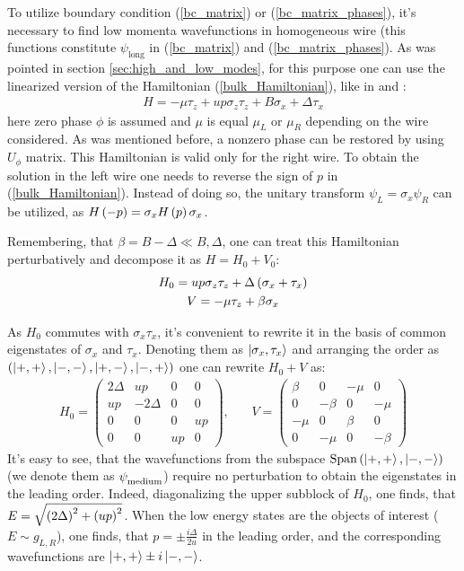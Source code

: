 To utilize boundary condition (\ref{bc_matrix}) or (\ref{bc_matrix_phases}), it's necessary to find low momenta wavefunctions in homogeneous wire (this functions constitute $ \psi_{\mathrm{long}}$ in (\ref{bc_matrix}) and (\ref{bc_matrix_phases}). As was pointed in section \ref{sec:high_and_low_modes}, for this purpose one can use the linearized version of the Hamiltonian (\ref{bulk_Hamiltonian}), like in \cite{Oreg_2010} and \cite{Lutchyn_2010}:
\begin{gather}
\label{linearized_hamiltonian}
		H
	=
	-\mu \tau_z
	+
	u p \sigma_z \tau_z
	+
	B\sigma_x	
	+
	\Delta\tau_x
\end{gather}
here zero phase $ \phi $ is assumed and $ \mu $ is equal $ \mu_L $ or $ \mu_R $ depending on the wire considered. As was mentioned before, a nonzero phase can be restored by using $ U_\phi $ matrix. This Hamiltonian is valid only for the right wire. To obtain the solution in the left wire one needs to reverse the sign of $ p $ in (\ref{bulk_Hamiltonian}). Instead of doing so, the unitary transform $ \psi_L=\sigma_x\psi_R $ can be utilized, as $ H\left(-p\right)=\sigma_x H\left(p\right)\sigma_x $.

Remembering, that $ \beta=B-\Delta\ll B, \Delta $, one can	treat this Hamiltonian perturbatively and decompose it as $ H=H_0+V_0$:
\begin{gather}
	H_0=
	u p \sigma_z \tau_z
	+
	\Delta
	\left(\sigma_x	
	+
	\tau_x\right)
\\
V=-\mu \tau_z+\beta\sigma_x
\end{gather}

As $ H_0 $ commutes with $ \sigma_x\tau_x $, it's convenient to rewrite it in the basis of common eigenstates of $ \sigma_x $ and $ \tau_x $. Denoting them as $ \ket{\sigma_x, \tau_x }$ and arranging the order as $  \left(\ket{+, + },\ket{-, - },\ket{+, - },\ket{-, + }\right) $ one can rewrite $ H_0+V $ as:
\begin{gather}
	H_0
	=
	\begin{pmatrix}
	2\Delta & up & 0 & 0 \\
	up & -2\Delta & 0 & 0\\
	0 & 0 & 0 & up \\
	0 & 0 & up & 0 
	\end{pmatrix},
	~~~~~~~~
	V
	=
		\begin{pmatrix}
	\beta & 0 & -\mu & 0 \\
	0 & -\beta & 0 & -\mu\\
	-\mu & 0 & \beta & 0 \\
	0 & -\mu & 0 & -\beta 
	\end{pmatrix}
\end{gather}
It's easy to see, that the wavefunctions from the subspace $ \mathrm{Span}\left(\ket{+, + },\ket{-, - }\right) $ (we denote them as $ \psi_{\mathrm{medium}}^{\mathrm{}} $) require no perturbation to obtain the eigenstates in the leading order. Indeed, diagonalizing the upper subblock of $ H_0 $, one finds, that $ E=\sqrt{\left(2\Delta\right)^2+\left(up\right)^2} $. When the low energy states are the objects of interest ($ E\sim g_{L,R} $), one finds, that $ p =\pm\frac{i\Delta}{2u} $ in the leading order, and the corresponding wavefunctions are $\ket{+, + }\pm i\ket{-, - } $. 

